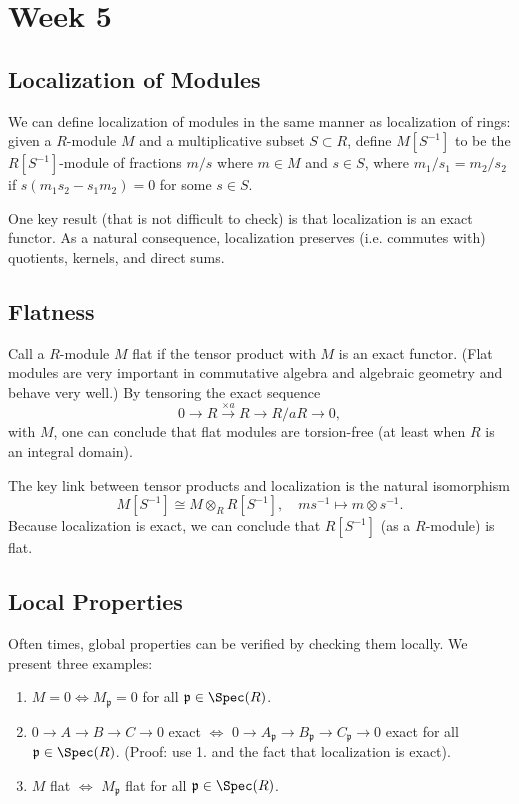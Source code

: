 \section{Week 5}

\subsection{Localization of Modules}
We can define localization of modules in the same manner as localization of rings: given a $R$-module $M$ and a multiplicative subset $S \subset R$, define $M[S^{-1}]$ to be the $R[S^{-1}]$-module of fractions $m/s$ where $m \in M$ and $s \in S$, where $m_1/s_1 = m_2/s_2$ if $s(m_1s_2-s_1m_2) = 0$ for some $s \in S$.

One key result (that is not difficult to check) is that localization is an exact functor. As a natural consequence, localization preserves (i.e. commutes with) quotients, kernels, and direct sums.

\subsection{Flatness}
Call a $R$-module $M$ flat if the tensor product with $M$ is an exact functor. (Flat modules are very important in commutative algebra and algebraic geometry and behave very well.) By tensoring the exact sequence
\[
    0 \to R \xrightarrow{\times a} R \to R/aR \to 0,
\]
with $M$, one can conclude that flat modules are torsion-free (at least when $R$ is an integral domain).

The key link between tensor products and localization is the natural isomorphism
\[
    M[S^{-1}] \cong M \otimes_R R[S^{-1}], \quad ms^{-1} \mapsto m \otimes s^{-1}.
\]
Because localization is exact, we can conclude that $R[S^{-1}]$ (as a $R$-module) is flat.

\subsection{Local Properties}
Often times, global properties can be verified by checking them locally. We present three examples:
\begin{enumerate}
    \item $M = 0 \iff M_{\mathfrak p} = 0$ for all $\mathfrak p \in \Spec(R)$.
    \item $0 \to A \to B \to C \to 0$ exact $\iff$ $0 \to A_{\mathfrak p} \to B_{\mathfrak p} \to C_{\mathfrak p} \to 0$ exact for all $\mathfrak p \in \Spec(R)$. (Proof: use 1. and the fact that localization is exact).
    \item $M$ flat $\iff$ $M_{\mathfrak p}$ flat for all $\mathfrak p \in \Spec(R)$.
\end{enumerate}

